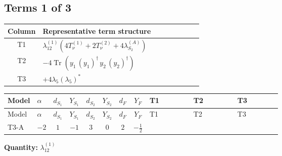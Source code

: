 \documentclass[8pt]{article}
\begin{document}
\begin{landscape}
\subsection*{Terms 1 of 3}
\begin{center}
\begin{tabular}{@{}c >{\raggedright\arraybackslash}p{0.82\linewidth}@{}}
\toprule
Column & Representative term structure \\
\midrule
T1 & \(\displaystyle {\lambda_{12}^{(1)}} (4 T_{\nu}^{(1)}+2 T_{\nu}^{(2)}+4 {\lambda_{S_2}^{(A)}})\) \\
\midrule
T2 & \(\displaystyle -4 \operatorname{Tr}\!\left({y_1}\,\left({y_1}\right)^{\dagger}\,{y_2}\,\left({y_2}\right)^{\dagger}\right)\) \\
\midrule
T3 & \(\displaystyle +4 {\lambda_5} \left({\lambda_5}\right)^{*}\) \\
\midrule
\bottomrule
\end{tabular}
\end{center}
\smallskip
\tiny
\begin{longtable}{@{}llcccccc >{\raggedright\arraybackslash}p{0.21\linewidth} >{\raggedright\arraybackslash}p{0.21\linewidth} >{\raggedright\arraybackslash}p{0.21\linewidth}@{}}
\toprule
Model & $\alpha$ & $d_{S_1}$ & $Y_{S_1}$ & $d_{S_2}$ & $Y_{S_2}$ & $d_F$ & $Y_F$ & T1 & T2 & T3 \\
\midrule
\endfirsthead
\toprule
Model & $\alpha$ & $d_{S_1}$ & $Y_{S_1}$ & $d_{S_2}$ & $Y_{S_2}$ & $d_F$ & $Y_F$ & T1 & T2 & T3 \\
\midrule
\endhead
T3-A & $-2$ & $1$ & $-1$ & $3$ & $0$ & $2$ & $-\frac{1}{2}$ & \scriptsize\adjustbox{max width=\linewidth}{$\begin{gathered} {\lambda_{12}^{(1)}} (4 T_{\nu}^{(1)}+2 T_{\nu}^{(2)}+4 {\lambda_{S_2}^{(A)}})\end{gathered}$} & \scriptsize\adjustbox{max width=\linewidth}{$\begin{gathered} -4 \operatorname{Tr}\!\left({y_1}\,\left({y_1}\right)^{\dagger}\,{y_2}\,\left({y_2}\right)^{\dagger}\right)\end{gathered}$} & \scriptsize\adjustbox{max width=\linewidth}{$\begin{gathered} +4 {\lambda_5} \left({\lambda_5}\right)^{*}\end{gathered}$} \\
\midrule
\bottomrule
\end{longtable}
\clearpage
\noindent\textbf{Quantity: }$\lambda_{12}^{(1)}$\par\smallskip

\end{landscape}
\end{document}
